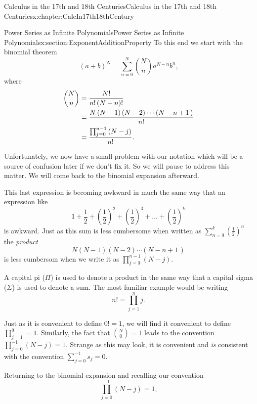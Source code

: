 \begin{chapterptx}{Calculus in the 17th and 18th Centuries}{}{Calculus in the 17th and 18th Centuries}{}{}{x:chapter:CalcIn17th18thCentury}
\begin{sectionptx}{Power Series as Infinite Polynomials}{}{Power Series as Infinite Polynomials}{}{}{x:section:ExponentAdditionProperty}
		To this end we start with the binomial theorem%
		\begin{equation*}
			\left(a+b\right)^N=\sum_{n=0}^N\binom{N}{n}a^{N-n}b^n\text{,}
		\end{equation*}
		where%
		\begin{align*}
			\binom{N}{n}& =\frac{N!}{n!\left(N-n\right)!}\\
			& =\frac{N\left(N-1\right)\left(N-2\right)\cdots\left(N-n+1\,\right)}{n!}\\
			& =\frac{\prod_{j=0}^{n-1}\left(N-j\right)}{n!}\text{.}
		\end{align*}
		\par
		Unfortunately, we now have a small problem with our notation which will be a source of confusion later if we don't fix it. So we will pause to address this matter. We will come back to the binomial expansion afterward.%
		\par
		This last expression is becoming awkward in much the same way that an expression like%
		\begin{equation*}
			1+\frac{1}{2}+\left(\frac{1}{2}\right)^2+\left(\frac{1}{2}\right)^3+\ldots+\left(\frac{1}{2}\right)^k
		\end{equation*}
		is awkward. Just as this sum is less cumbersome when written as \(\sum_{n=0}^k\left(\frac{1}{2}\right)^n\) the \emph{product}%
		\begin{equation*}
			N\left(N-1\right)\left(N-2\right)\cdots\left(N-n+1\,\right)
		\end{equation*}
		is less cumbersom when we write it as \(\prod_{j=0}^{n-1}\left(N-j\right)\).%
		\par
		A capital pi (\(\Pi\)) is used to denote a product in the same way that a capital sigma (\(\Sigma\)) is used to denote a sum. The most familiar example would be writing%
		\begin{equation*}
			n!=\prod_{j=1}^{n}j\text{.}
		\end{equation*}
		\par
		Just as it is convenient to define \(0!=1\), we will find it convenient to define \(\prod_{j=1}^{0}=1\).  Similarly, the fact that \(\binom{N}{0}=1\) leads to the convention \(\prod_{j=0}^{-1}\left(N-j\right)=1\).  Strange as this may look, it is convenient and \emph{is} consistent with the convention \(\sum_{j=0}^{-1}s_j=0\).%
		\par
		Returning to the binomial expansion and recalling our convention%
		\begin{equation*}
			\prod_{j=0}^{-1}\left(N-j\right)=1\text{,}

\end{equation*}
\end{sectionptx}
\end{chapterptx}
